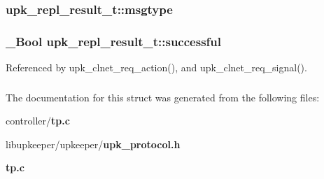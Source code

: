 \subsubsection[{msgtype}]{ {\bf upk\_\-repl\_\-result\_\-t::msgtype}}\label{structupk__repl__result__t_a248ccfdbcef62cc8a4733d18405c1dc4}
\subsubsection[{successful}]{\setlength{\rightskip}{0pt plus 5cm}\_\-Bool {\bf upk\_\-repl\_\-result\_\-t::successful}}\label{structupk__repl__result__t_ae876ade4f2525672e8b138a7fa958912}


Referenced by upk\_\-clnet\_\-req\_\-action(), and upk\_\-clnet\_\-req\_\-signal().

\subsubsection[{UPK\_\-V0\_\-REPL\_\-RESULT\_\-T\_\-FIELDS}]{}\label{structupk__repl__result__t_a01f0b780b7197ff655348942bcecf36e}


The documentation for this struct was generated from the following files:\begin{DoxyCompactItemize}
\item 
controller/{\bf tp.c}\item 
libupkeeper/upkeeper/{\bf upk\_\-protocol.h}\item 
{\bf tp.c}\end{DoxyCompactItemize}
